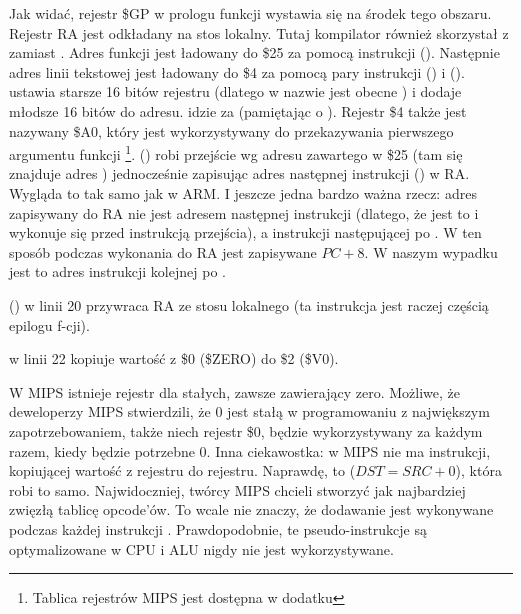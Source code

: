 

Jak widać, rejestr \$GP w prologu funkcji wystawia się na środek tego obszaru.
Rejestr \ac{RA} jest odkładany na stos lokalny.
Tutaj kompilator również skorzystał z \puts zamiast \printf.
Adres funkcji \puts jest ładowany do \$25 za pomocą instrukcji  ().
Następnie adres linii tekstowej jest ładowany do \$4 za pomocą pary instrukcji  () i
 ().
 ustawia starsze 16 bitów rejestru (dlatego w nazwie jest obecne ) i 
dodaje młodsze 16 bitów do adresu.
 idzie za  (pamiętając o ).
Rejestr \$4 także jest nazywany \$A0, który jest wykorzystywany do przekazywania pierwszego argumentu funkcji
\footnote{Tablica rejestrów MIPS jest dostępna w dodatku }.
 () robi przejście wg adresu zawartego w \$25 (tam się znajduje adres \puts) 
jednocześnie zapisując adres następnej instrukcji () w \ac{RA}.
Wygląda to tak samo jak w ARM.
I jeszcze jedna bardzo ważna rzecz: adres zapisywany do \ac{RA} nie jest adresem następnej instrukcji (dlatego, że jest to
 i wykonuje się przed instrukcją przejścia),
a instrukcji następującej po .
W ten sposób podczas wykonania  do \ac{RA} jest zapisywane $PC + 8$.
W naszym wypadku jest to adres instrukcji  kolejnej po .

 () w linii 20 przywraca \ac{RA} ze stosu lokalnego (ta instrukcja jest raczej częścią epilogu f-cji).

 w linii 22 kopiuje wartość z \$0 (\$ZERO) do \$2 (\$V0).

\label{MIPS_zero_register}
W MIPS istnieje rejestr dla stałych, zawsze zawierający zero.
Możliwe, że deweloperzy MIPS stwierdzili, że 0 jest stałą w programowaniu z największym zapotrzebowaniem,
także niech rejestr \$0, będzie wykorzystywany za każdym razem, kiedy będzie potrzebne 0.
Inna ciekawostka: w MIPS nie ma instrukcji, kopiującej wartość z rejestru do rejestru.
Naprawdę,  to  ($DST=SRC+0$), która robi to samo.
Najwidoczniej, twórcy MIPS chcieli stworzyć jak najbardziej zwięzłą tablicę opcode'ów.
To wcale nie znaczy, że dodawanie jest wykonywane podczas każdej instrukcji .
Prawdopodobnie, te pseudo-instrukcje są optymalizowane w \ac{CPU} i \ac{ALU} nigdy nie jest wykorzystywane.

